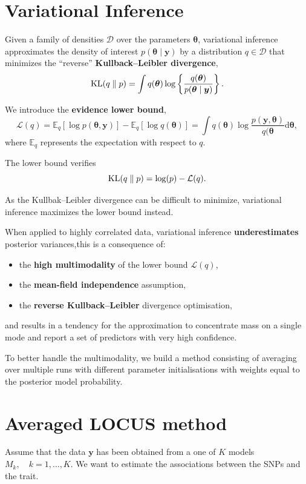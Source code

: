 \documentclass[portrait, a0, 30pt]{sciposter}
\DeclareMathOperator*{\KL}{{\rm KL}}
\begin{document}
\begin{multicols*}{2}
\section{Variational Inference}
Given a family of densities $\mathcal{D}$ over the parameters $\boldsymbol{\theta}$, variational inference approximates the density of interest $p(\boldsymbol{\theta}\mid\boldsymbol{y})$ by a distribution $q \in \mathcal{D}$ that minimizes the ``reverse'' \textbf{Kullback--Leibler divergence},
\begin{equation*}
\KL (q \parallel p) = \int q(\boldsymbol{\theta}) \log \left\lbrace\frac{q(\boldsymbol{\theta})}{p(\boldsymbol{\theta}\mid\boldsymbol{y})}\right\rbrace.
\end{equation*}

We introduce the \textbf{evidence lower bound},
\[
\mathcal{L}(q)=\mathbb{E}_q\left[\log p(\boldsymbol{\theta},\boldsymbol{y})\right]-\mathbb{E}_q\left[\log q(\boldsymbol{\theta})\right] = \int q(\boldsymbol{\theta})\log\frac{p(\boldsymbol{y},\boldsymbol{\theta})}{q(\boldsymbol{\theta}}\mathrm{d}\boldsymbol{\theta},
\]
where $\mathbb{E}_q$ represents the expectation with respect to $q$.

The lower bound verifies
\[
\KL(q\parallel p) = \log(p)-\mathcal{L}(q).
\]

As the Kullbak--Leibler divergence can be difficult to minimize, variational inference maximizes the lower bound instead.

\begin{shaded}
When applied to highly correlated data, variational inference \textbf{underestimates} posterior variances,this is a consequence of: \begin{itemize}
\item the \textbf{high multimodality} of the lower bound $\mathcal{L}(q)$,
\item the \textbf{mean-field independence} assumption,
\item the \textbf{reverse Kullback--Leibler} divergence optimisation,
\end{itemize}
and results in a tendency for the approximation to concentrate mass on a single mode and report a set of predictors with very high confidence.

To better handle the multimodality, we build a method consisting of averaging over multiple runs with different parameter initialisations with weights equal to the posterior model probability.
\end{shaded}
\columnbreak
\section{Averaged LOCUS method}
Assume that the data $\boldsymbol{y}$ has been obtained from a one of $K$ models $M_k,\quad k=1,\dots,K$. We want to estimate the associations between the SNPs and the trait.


\end{multicols*}
\end{document}
